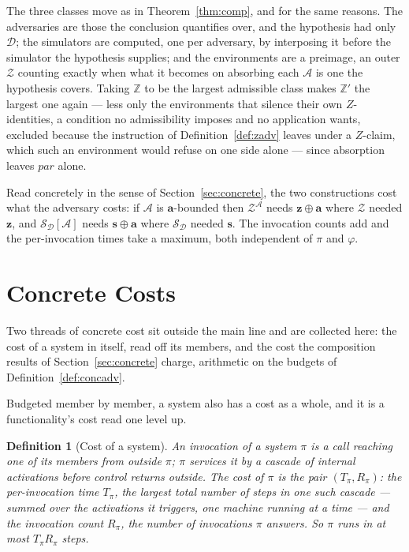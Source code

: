 \documentclass[11pt,a4paper]{article}
\newcommand{\pars}{\mathit{par}}
\newcommand{\Zenv}{\mathcal{Z}}
\newcommand{\Adv}{\mathcal{A}}
\newcommand{\Dum}{\mathcal{D}}
\newcommand{\Sim}{\mathcal{S}}
\newcommand{\bd}[1]{\mathbf{#1}}
\newcommand{\ZenvSet}{\mathbb{Z}}
\theoremstyle{accentdef}
\newtheorem{definition}{Definition}[section]
\theoremstyle{accentplain}
\begin{document}
The three classes move as in Theorem~\ref{thm:comp}, and for the same reasons. The adversaries
are those the conclusion quantifies over, and the hypothesis had only $\Dum$; the simulators are
computed, one per adversary, by interposing it before the simulator the hypothesis supplies; and
the environments are a preimage, an outer $\Zenv$ counting exactly when what it becomes on
absorbing each $\Adv$ is one the hypothesis covers. Taking $\ZenvSet$ to be the largest
admissible class makes $\ZenvSet'$ the largest one again --- less only the environments that
silence their own $Z$-identities, a condition no admissibility imposes and no application wants,
excluded because the instruction of Definition~\ref{def:zadv} leaves under a $Z$-claim, which
such an environment would refuse on one side alone --- since absorption leaves $\pars$ alone.

Read concretely in the sense of Section~\ref{sec:concrete}, the two constructions cost what the
adversary costs: if $\Adv$ is $\bd{a}$-bounded then $\Zenv^{\Adv}$ needs $\bd{z} \oplus \bd{a}$ where
$\Zenv$ needed $\bd{z}$, and $\Sim_{\Dum}[\Adv]$ needs $\bd{s} \oplus \bd{a}$ where $\Sim_{\Dum}$ needed
$\bd{s}$. The invocation counts add and the per-invocation times take a maximum, both independent
of $\pi$ and $\varphi$.

\section{Concrete Costs}\label{app:conccosts}

Two threads of concrete cost sit outside the main line and are collected here: the cost of a
system in itself, read off its members, and the cost the composition results of
Section~\ref{sec:concrete} charge, arithmetic on the budgets of Definition~\ref{def:concadv}.

Budgeted member by member, a system also has a cost as a whole, and it is a functionality's cost
read one level up.

\begin{definition}[Cost of a system]\label{def:syscost}
An \emph{invocation} of a system $\pi$ is a call reaching one of its members from outside $\pi$;
$\pi$ services it by a cascade of internal activations before control returns outside. The
\emph{cost} of $\pi$ is the pair $(T_\pi, R_\pi)$: the \emph{per-invocation time} $T_\pi$, the
largest total number of steps in one such cascade --- summed over the activations it triggers,
one machine running at a time --- and the \emph{invocation count} $R_\pi$, the number of
invocations $\pi$ answers. So $\pi$ runs in at most $T_\pi R_\pi$ steps.
\end{definition}
\end{document}
